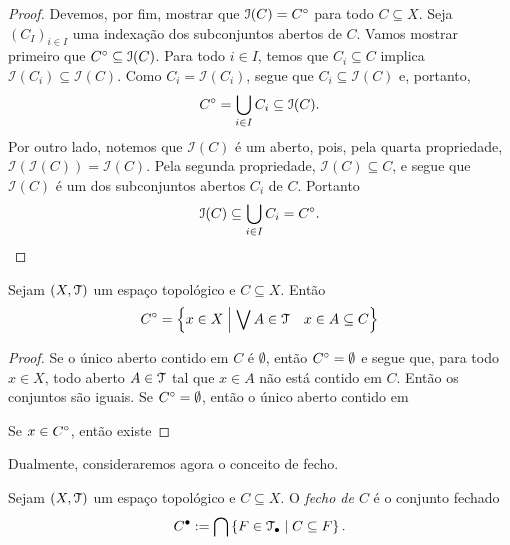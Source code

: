 \begin{proof}
Devemos, por fim, mostrar que $\mathcal I(C)={C}^\circ$ para todo $C \subseteq X$. Seja $(C_I)_{i \in I}$ uma indexação dos subconjuntos abertos de $C$. Vamos mostrar primeiro que ${C}^\circ \subseteq \mathcal I(C)$. Para todo $i \in I$, temos que $C_i \subseteq C$ implica $\mathcal I(C_i) \subseteq \mathcal I(C)$. Como $C_i = \mathcal I(C_i)$, segue que $C_i \subseteq \mathcal I(C)$ e, portanto,
	\begin{equation*}
	{C}^\circ = \bigcup_{i \in I} C_i \subseteq \mathcal I(C).
	\end{equation*}
	Por outro lado, notemos que $\mathcal I(C)$ é um aberto, pois, pela quarta propriedade, $\mathcal I(\mathcal I(C))= \mathcal I(C)$. Pela segunda propriedade, $\mathcal I(C) \subseteq C$, e segue que $\mathcal I(C)$ é um dos subconjuntos abertos $C_i$ de $C$. Portanto	
	\begin{equation*}
	\mathcal I(C) \subseteq \bigcup_{i \in I} C_i = {C}^\circ.
	\end{equation*}
\end{proof}

\begin{proposition}
	Sejam $(X, \mathcal{T})$ um espaço topológico e $C \subseteq X$. Então
	\begin{equation*}
	{C}^\circ = \left\{{x \in X}\;\middle\vert\;{\bigvee\nolimits A \in \mathcal{T} \quad x \in A \subseteq C}\right\}
	\end{equation*}
\end{proposition}
\begin{proof}
	Se o único aberto contido em $C$ é $\emptyset$, então ${C}^\circ=\emptyset$ e segue que, para todo $x \in X$, todo aberto $A \in \mathcal{T}$ tal que $x \in A$ não está contido em $C$. Então os conjuntos são iguais.
	Se ${C}^\circ=\emptyset$, então o único aberto contido em 
	
	
	Se $x \in {C}^\circ$, então existe
\end{proof}

	Dualmente, consideraremos agora o conceito de fecho.

\begin{definition}
Sejam $(X,\mathcal{T})$ um espaço topológico e $C \subseteq X$. O \emph{fecho de $C$} é o conjunto fechado
	\begin{equation*}
	{C}^\bullet := \bigcap \left\{{F \in \mathcal{T}_{\bullet}}\;\middle\vert\;{C \subseteq F}\right\}.
	\end{equation*}
\end{definition}

